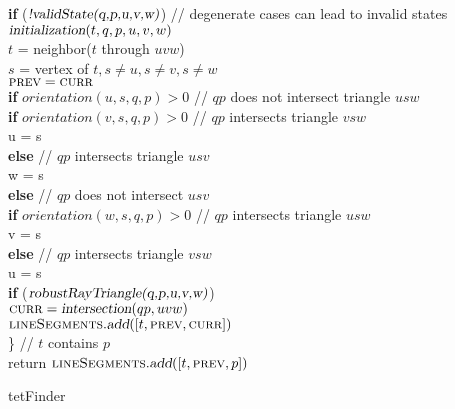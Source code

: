 \documentclass[../thesis.tex]{subfiles}
\begin{document}
\begin{algo*}
{\begin{numbertabbing}
      \> \> \textbf{if} ($\textsl{!validState(q,p,u,v,w)}$) // degenerate cases can lead to invalid states \label{}\\
      \> \> \> $\textsl{initialization}(t, q,p,u,v,w)$ \label{}\\
      \> \> $t$ = neighbor($t$ through $uvw$) \label{}\\
      \> \> $s$ = vertex of $t, s \neq u, s \neq v, s \neq w$ \label{}\\
      \> \> $\textsc{prev} = \textsc{curr}$ \label{}\\
      \> \> \textbf{if} $orientation(u,s,q,p) > 0$ // $qp$ does not intersect triangle $usw$\label{}\\
      \> \> \> \textbf{if} $orientation(v,s,q,p) > 0$ // $qp$ intersects triangle $vsw$ \label{}\\
      \> \> \> \> u = s \label{}\\
      \> \> \> \textbf{else} // $qp$ intersects triangle $usv$ \label{}\\
      \> \> \> \> w = s \label{}\\
      \> \> \textbf{else} // $qp$ does not intersect $usv$ \label{}\\
      \> \> \> \textbf{if} $orientation(w,s,q,p) > 0$ // $qp$ intersects triangle $usw$ \label{}\\
      \> \> \> \> v = s \label{}\\
      \> \> \> \textbf{else} // $qp$ intersects triangle $vsw$ \label{}\\
      \> \> \> \> u = s \label{}\\
      \> \> \textbf{if} ($\textsl{robustRayTriangle(q,p,u,v,w)}$)\label{}\\
      \> \> \> $\textsc{curr} = \textsl{intersection}(qp, uvw)$ \label{}\\
      \> \> \> $\textsc{lineSegments}.\textsl{add}([t, \textsc{prev}, \textsc{curr}])$ \label{}\\
      \> \} // $t$ contains $p$ \label{}\\
      \> return $\textsc{lineSegments}.\textsl{add}([t, \textsc{prev}, p])$ \label{}\\
    \end{numbertabbing}
  }
  \caption{tetFinder}
  \label{alg:tetFinder}
\end{algo*}
  
\end{document}
